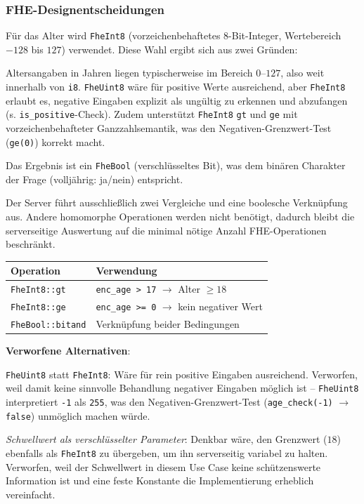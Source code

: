 \subsubsection{FHE-Designentscheidungen}

Für das Alter wird \verb|FheInt8| (vorzeichenbehaftetes 8-Bit-Integer, Wertebereich $-128$ bis $127$) verwendet. Diese Wahl ergibt sich aus zwei Gründen:

Altersangaben in Jahren liegen typischerweise im Bereich $0$--$127$, also weit innerhalb von \verb|i8|. \verb|FheUint8| wäre für positive Werte ausreichend, aber \verb|FheInt8| erlaubt es, negative Eingaben explizit als ungültig zu erkennen und abzufangen (s. \verb|is_positive|-Check). Zudem unterstützt \verb|FheInt8| \verb|gt| und \verb|ge| mit vorzeichenbehafteter Ganzzahlsemantik, was den Negativen-Grenzwert-Test (\verb|ge(0)|) korrekt macht.\par
Das Ergebnis ist ein \verb|FheBool| (verschlüsseltes Bit), was dem binären Charakter der Frage (volljährig: ja/nein) entspricht.

Der Server führt ausschließlich zwei Vergleiche und eine boolesche Verknüpfung aus. Andere homomorphe Operationen werden nicht benötigt, dadurch bleibt die serverseitige Auswertung auf die minimal nötige Anzahl FHE-Operationen beschränkt.

\begin{table}[H]
\centering
\begin{tabular}{||l|l||}
    \hline
    \textbf{Operation} & \textbf{Verwendung} \\
    \hline\hline
    \verb|FheInt8::gt| & \verb|enc_age > 17| $\rightarrow$ Alter $\geq 18$ \\
    \hline
    \verb|FheInt8::ge| & \verb|enc_age >= 0| $\rightarrow$ kein negativer Wert \\
    \hline
    \verb|FheBool::bitand| & Verknüpfung beider Bedingungen \\
    \hline
\end{tabular}
\end{table}

\textbf{Verworfene Alternativen}:

\verb|FheUint8| statt \verb|FheInt8|: Wäre für rein positive Eingaben ausreichend. Verworfen, weil damit keine sinnvolle Behandlung negativer Eingaben möglich ist -- \verb|FheUint8| interpretiert \verb|-1| als \verb|255|, was den Negativen-Grenzwert-Test (\verb|age_check(-1)| $\rightarrow$ \verb|false|) unmöglich machen würde.

\textit{Schwellwert als verschlüsselter Parameter}: Denkbar wäre, den Grenzwert ($18$) ebenfalls als \verb|FheInt8| zu übergeben, um ihn serverseitig variabel zu halten. Verworfen, weil der Schwellwert in diesem Use Case keine schützenswerte Information ist und eine feste Konstante die Implementierung erheblich vereinfacht.

